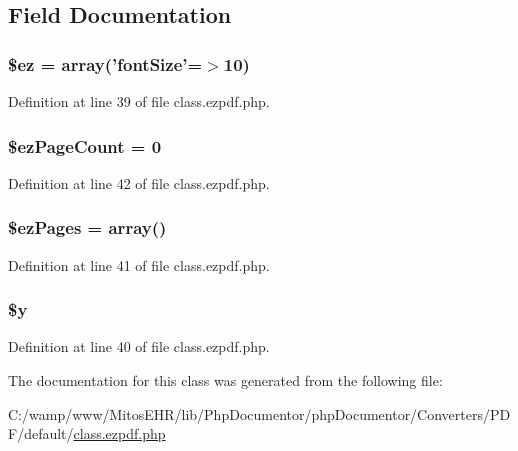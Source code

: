 \subsection{\-Field \-Documentation}
\hypertarget{class_cezpdf_a4e2d45a06a93dfc4890ad13b642d5795}{
\subsubsection[{\$ez}]{\setlength{\rightskip}{0pt plus 5cm}\$ez = array('font\-Size'=$>$10)}}\label{class_cezpdf_a4e2d45a06a93dfc4890ad13b642d5795}


\-Definition at line 39 of file class.\-ezpdf.\-php.

\hypertarget{class_cezpdf_a7870a8b7d3cad1346107e48a87165909}{
\subsubsection[{\$ez\-Page\-Count}]{\setlength{\rightskip}{0pt plus 5cm}\$ez\-Page\-Count = 0}}\label{class_cezpdf_a7870a8b7d3cad1346107e48a87165909}


\-Definition at line 42 of file class.\-ezpdf.\-php.

\hypertarget{class_cezpdf_a83c871beb78c15a5e93fb5c0c143d8de}{
\subsubsection[{\$ez\-Pages}]{\setlength{\rightskip}{0pt plus 5cm}\$ez\-Pages = array()}}\label{class_cezpdf_a83c871beb78c15a5e93fb5c0c143d8de}


\-Definition at line 41 of file class.\-ezpdf.\-php.

\hypertarget{class_cezpdf_a77b973d137fb33212e018b042df6e3e7}{
\subsubsection[{\$y}]{\setlength{\rightskip}{0pt plus 5cm}\$y}}\label{class_cezpdf_a77b973d137fb33212e018b042df6e3e7}


\-Definition at line 40 of file class.\-ezpdf.\-php.



\-The documentation for this class was generated from the following file\-:\begin{DoxyCompactItemize}
\item 
\-C\-:/wamp/www/\-Mitos\-E\-H\-R/lib/\-Php\-Documentor/php\-Documentor/\-Converters/\-P\-D\-F/default/\hyperlink{class_8ezpdf_8php}{class.\-ezpdf.\-php}\end{DoxyCompactItemize}
